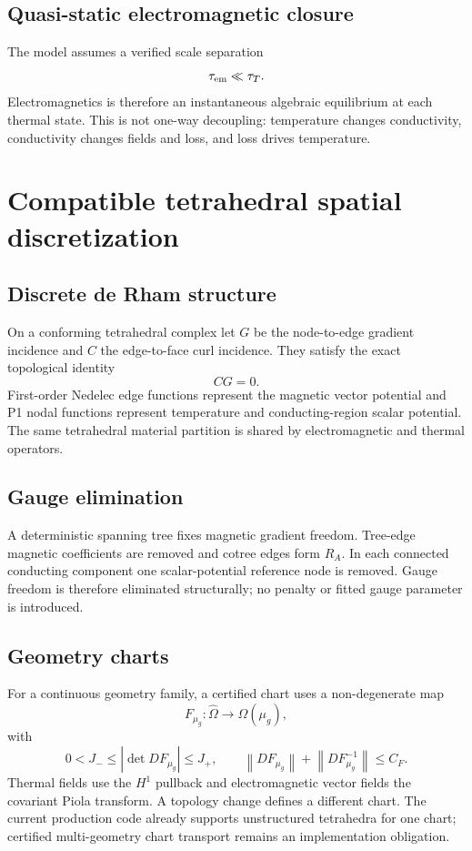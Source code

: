 \documentclass[11pt]{article}
\theoremstyle{remark}
\newcommand{\norm}[1]{\left\lVert #1\right\rVert}
\begin{document}
\subsection{Quasi-static electromagnetic closure}
The model assumes a verified scale separation
\[
\tau_{\rm em}\ll\tau_T.
\]
Electromagnetics is therefore an instantaneous algebraic equilibrium at each thermal state. This is not one-way decoupling: temperature changes conductivity, conductivity changes fields and loss, and loss drives temperature.

\section{Compatible tetrahedral spatial discretization}

\subsection{Discrete de Rham structure}
On a conforming tetrahedral complex let \(G\) be the node-to-edge gradient incidence and \(C\) the edge-to-face curl incidence. They satisfy the exact topological identity
\begin{equation}
\boxed{CG=0.}
\label{eq:cg0}
\end{equation}
First-order Nedelec edge functions represent the magnetic vector potential and P1 nodal functions represent temperature and conducting-region scalar potential. The same tetrahedral material partition is shared by electromagnetic and thermal operators.

\subsection{Gauge elimination}
A deterministic spanning tree fixes magnetic gradient freedom. Tree-edge magnetic coefficients are removed and cotree edges form \(R_A\). In each connected conducting component one scalar-potential reference node is removed. Gauge freedom is therefore eliminated structurally; no penalty or fitted gauge parameter is introduced.

\subsection{Geometry charts}
For a continuous geometry family, a certified chart uses a non-degenerate map
\[
F_{\mu_g}:\widehat\Omega\rightarrow\Omega(\mu_g),
\]
with
\[
0<J_-\le |\det DF_{\mu_g}|\le J_+,
\qquad
\norm{DF_{\mu_g}}+\norm{DF_{\mu_g}^{-1}}\le C_F.
\]
Thermal fields use the \(H^1\) pullback and electromagnetic vector fields the covariant Piola transform. A topology change defines a different chart. The current production code already supports unstructured tetrahedra for one chart; certified multi-geometry chart transport remains an implementation obligation.
\end{document}
